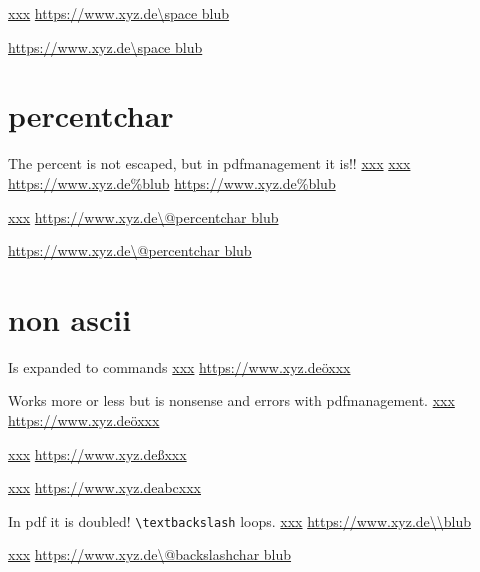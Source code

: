 \documentclass{article}
\begin{document}
\href{https://www.xyz.de\space blub}{xxx}
\url{https://www.xyz.de\space blub}

\parbox{5cm}{\url{https://www.xyz.de\space blub}}

\section{percentchar}
The percent is not escaped, but in pdfmanagement it is!!
\href{https://www.xyz.de%blub}{xxx}
\href{https://www.xyz.de\%blub}{xxx}
\url{https://www.xyz.de%blub}
\url{https://www.xyz.de\%blub}

\makeatletter
\href{https://www.xyz.de\@percentchar blub}{xxx}
\url{https://www.xyz.de\@percentchar blub}
\parbox{3cm}{\url{https://www.xyz.de\@percentchar blub}}


\makeatother
\section{non ascii}
Is expanded to commands
\href{https://www.xyz.deöxxx}{xxx}
\url{https://www.xyz.deöxxx}


Works more or less but is nonsense and errors with
pdfmanagement. 
\selectfont
\href{https://www.xyz.deöxxx}{xxx}
\url{https://www.xyz.deöxxx}

\href{https://www.xyz.deßxxx}{xxx}
\url{https://www.xyz.deßxxx}


\def\blub{abc}
\href{https://www.xyz.de\blub xxx}{xxx}
\url{https://www.xyz.de\blub xxx}


In pdf it is doubled! \verb+\textbackslash+ loops.
\href{https://www.xyz.de\\blub}{xxx}
\url{https://www.xyz.de\\blub}

\makeatletter
\href{https://www.xyz.de\@backslashchar blub}{xxx}
\url{https://www.xyz.de\@backslashchar blub}
\end{document}
